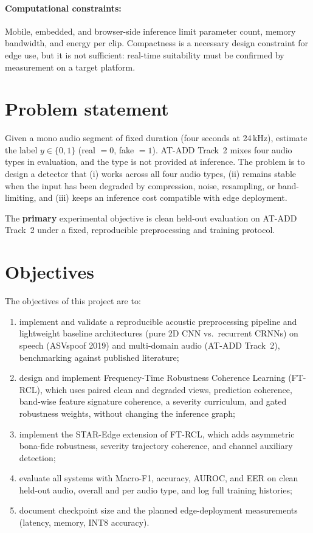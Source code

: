 \paragraph{Computational constraints:} Mobile, embedded, and browser-side inference limit parameter count, memory bandwidth, and energy per clip. Compactness is a necessary design constraint for edge use, but it is not sufficient: real-time suitability must be confirmed by measurement on a target platform.

\section{Problem statement}

Given a mono audio segment of fixed duration (four seconds at 24\,kHz), estimate the label $y \in \{0,1\}$ (real $=0$, fake $=1$). AT-ADD Track~2 mixes four audio types in evaluation, and the type is not provided at inference. The problem is to design a detector that (i) works across all four audio types, (ii) remains stable when the input has been degraded by compression, noise, resampling, or band-limiting, and (iii) keeps an inference cost compatible with edge deployment.

The \textbf{primary} experimental objective is clean held-out evaluation on AT-ADD Track~2 under a fixed, reproducible preprocessing and training protocol.

\section{Objectives}

The objectives of this project are to:
\begin{enumerate}
  \item implement and validate a reproducible acoustic preprocessing pipeline and lightweight baseline architectures (pure 2D CNN vs.\ recurrent CRNNs) on speech (ASVspoof 2019) and multi-domain audio (AT-ADD Track~2), benchmarking against published literature;
  \item design and implement Frequency-Time Robustness Coherence Learning (FT-RCL), which uses paired clean and degraded views, prediction coherence, band-wise feature signature coherence, a severity curriculum, and gated robustness weights, without changing the inference graph;
  \item implement the STAR-Edge extension of FT-RCL, which adds asymmetric bona-fide robustness, severity trajectory coherence, and channel auxiliary detection;
  \item evaluate all systems with Macro-F1, accuracy, AUROC, and EER on clean held-out audio, overall and per audio type, and log full training histories;
  \item document checkpoint size and the planned edge-deployment measurements (latency, memory, INT8 accuracy).
\end{enumerate}


